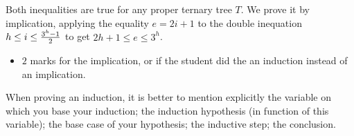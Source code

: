 \begin{enumerate}
\begin{solution}
Both inequalities are true for any proper ternary tree $T$.
%
We prove it by implication, applying the equality $e=2i+1$ to the
double inequation $h\leq i \leq {3^h-1\over 2}$ to get 
$2h+1\leq e \leq 3^h$.

\begin{markingScheme}
\begin{itemize}
\item $2$ marks for the implication, or if the student did the
an induction instead of an implication.
\end{itemize}
\end{markingScheme}

\end{solution}






\end{enumerate}


\begin{hint}
When proving an induction, it is better to mention explicitly
the variable on which you base your induction;
the induction hypothesis (in function of this variable);
the base case of your hypothesis;
the inductive step;
the conclusion.
\end{hint}


